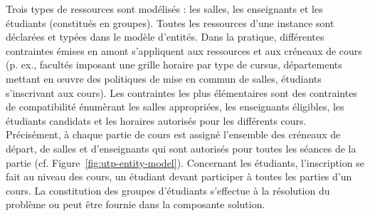 
Trois types de ressources sont modélisés : les salles, les enseignants et les étudiants (constitués en groupes).
Toutes les ressources d'une instance sont déclarées et typées dans le modèle d'entités.
%
%
Dans la pratique, différentes contraintes émises en amont s'appliquent aux ressources et aux créneaux de cours (p. ex., facultés imposant une grille horaire par type de cursus, départements mettant en œuvre des politiques de mise en commun de salles, étudiants s'inscrivant aux cours).
%
%
Les contraintes les plus élémentaires sont des contraintes de compatibilité énumèrant %
les salles appropriées, les enseignants éligibles, les étudiants candidats et les horaires autorisés pour les différents cours.
%
Précisément, à chaque partie de cours est assigné l'ensemble des créneaux de départ, de salles et d'enseignants qui sont autorisés pour toutes les séances de la partie (cf. Figure~\ref{fig:utp-entity-model}).
%
Concernant les étudiants, l'inscription se fait au niveau des cours, un étudiant devant participer à toutes les parties d'un cours.
La constitution des groupes d'étudiants s'effectue à la résolution du problème ou peut être fournie dans la composante solution. %


